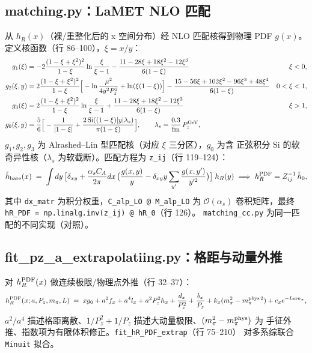 \documentclass[UTF8,11pt]{ctexart}
\begin{document}
\subsection{matching.py：LaMET NLO 匹配}
\label{sec:matching}

从 $h_R(x)$（裸/重整化后的 x 空间分布）经 NLO 匹配核得到物理 PDF $g(x)$。
定义核函数（行 86--100），$\xi=x/y$：
\begin{equation}
  \label{eq:g_kernels}
  \begin{aligned}
    g_1(\xi) &= -2\frac{(1-\xi+\xi^2)^2}{1-\xi}\ln\frac{\xi}{\xi-1}
    -\frac{11-28\xi+18\xi^2-12\xi^3}{6(1-\xi)} & \xi<0,\\
    g_2(\xi,y) &= 2\frac{(1-\xi+\xi^2)^2}{1-\xi}
    \Big[-\ln\frac{\mu^2}{4y^2 P_z^2} + \ln(\xi(1-\xi))\Big]
    -\frac{15-56\xi+102\xi^2-96\xi^3+48\xi^4}{6(1-\xi)} & 0<\xi<1,\\
    g_3(\xi) &= 2\frac{(1-\xi+\xi^2)^2}{1-\xi}\ln\frac{\xi}{\xi-1}
    +\frac{11-28\xi+18\xi^2-12\xi^3}{6(1-\xi)} & \xi>1,\\
    g_0(\xi,y) &= \frac56\Big[-\frac1{|1-\xi|}
    + \frac{2\,\mathrm{Si}((1-\xi)|y|\lambda_s)}{\pi(1-\xi)}\Big],
    \qquad \lambda_s = \frac{0.3}{\rm fm}\,P_z^{\rm GeV},
  \end{aligned}
\end{equation}
$g_1,g_2,g_3$ 为 Alrashed--Lin 型匹配核（对应 $\xi$ 三分区），$g_0$ 为含
正弦积分 $\mathrm{Si}$ 的软奇异性核（$\lambda_s$ 为软截断）。匹配方程为
\texttt{z\_ij}（行 119--124）：
\begin{equation}
  \label{eq:matching}
  \tilde h_{\rm bare}(x) \;=\; \int dy\,
  \big[\delta_{xy} + \frac{\alpha_s C_A}{2\pi} dx\,
  \big(\frac{g(x,y)}{y} - \delta_{xy} y \sum_{y'} \frac{g(x,y')}{y'^2}\big)\big]\; h_R(y)
  \;\Longrightarrow\; h_R^{\rm PDF} = Z_{ij}^{-1}\,\tilde h_0,
\end{equation}
其中 \texttt{dx\_matr} 为积分权重，\texttt{C\_alp\_LO @ M\_alp\_LO} 为
$\mathcal O(\alpha_s)$ 卷积矩阵，最终 \texttt{hR\_PDF = np.linalg.inv(z\_ij) @ hR\_0}（行 126）。
\texttt{matching\_cc.py} 为同一匹配的不同实现（对照）。

\subsection{fit\_pz\_a\_extrapolatiing.py：格距与动量外推}
\label{sec:extrap}

对 $h_R^{\rm PDF}(x)$ 做连续极限/物理点外推（行 32--37）：
\begin{equation}
  \label{eq:extrap}
  h_R^{\rm PDF}(x;a,P_z,m_\pi,L)
  \;=\; xg_0 + a^2 f_x + a^4 l_x + a^2 P_z^2 h_x
  + \frac{d_x}{P_z^2} + \frac{b_x}{P_z}
  + k_x (m_\pi^2 - m_\pi^{\rm phys\,2}) + c_x e^{-L a m_\pi},
\end{equation}
$a^2/a^4$ 描述格距离散、$1/P_z^2+1/P_z$ 描述大动量极限、$(m_\pi^2-m_\pi^{\rm phys})$ 为
手征外推、指数项为有限体积修正。\texttt{fit\_hR\_PDF\_extrap}（行 75--210）
对多系综联合 \texttt{Minuit} 拟合。
\end{document}
